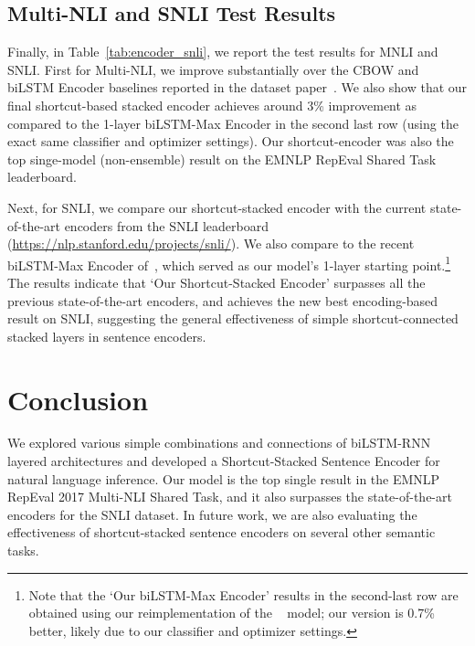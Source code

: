 \documentclass[11pt,letterpaper]{article}
\begin{document}
\subsection{Multi-NLI and SNLI Test Results}
Finally, in Table~\ref{tab:encoder_snli}, we report the test results for MNLI and SNLI. 
First for Multi-NLI, we improve substantially over the CBOW and biLSTM Encoder baselines reported in the dataset paper~\cite{williams2017broad}. We also show that our final shortcut-based stacked encoder achieves around 3\% improvement as compared to the 1-layer biLSTM-Max Encoder in the second last row (using the exact same classifier and optimizer settings). Our shortcut-encoder was also the top singe-model (non-ensemble) result on the EMNLP RepEval Shared Task leaderboard.

Next, for SNLI, we compare our shortcut-stacked encoder with the current state-of-the-art  encoders from the SNLI leaderboard (\url{https://nlp.stanford.edu/projects/snli/}). We also compare to the recent biLSTM-Max Encoder of~, which served as our model's 1-layer starting point.\footnote{Note that the `Our biLSTM-Max Encoder' results in the second-last row are obtained using our reimplementation of the ~ model; our version is 0.7\% better, likely due to our classifier and optimizer settings.}  
The results indicate that `Our Shortcut-Stacked  Encoder' surpasses all the previous state-of-the-art encoders, and achieves the new best encoding-based result on SNLI, suggesting the general effectiveness of simple shortcut-connected stacked layers in sentence encoders.


\section{Conclusion}
\label{sec:conclusion_and_future_work}
We explored various simple combinations and connections of biLSTM-RNN layered architectures and developed a Shortcut-Stacked Sentence Encoder for natural language inference. Our model is the top single result in the EMNLP RepEval 2017 Multi-NLI Shared Task, and it also surpasses the state-of-the-art encoders for the SNLI dataset. In future work, we are also evaluating the effectiveness of shortcut-stacked sentence encoders on several other semantic tasks.
\end{document}
